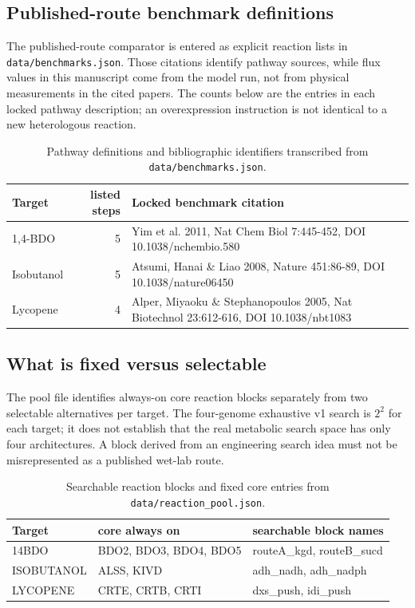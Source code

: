 \subsection{Published-route benchmark definitions}
The published-route comparator is entered as explicit reaction lists in \texttt{data/benchmarks.json}. Those citations identify pathway sources, while flux values in this manuscript come from the model run, not from physical measurements in the cited papers. The counts below are the entries in each locked pathway description; an overexpression instruction is not identical to a new heterologous reaction.\begin{table}[!htbp]\centering\small\caption{Pathway definitions and bibliographic identifiers transcribed from \texttt{data/benchmarks.json}.}\begin{tabular}{p{2cm}rp{6.6cm}}\hline Target & listed steps & Locked benchmark citation \\\hline
1,4-BDO & 5 & Yim et al. 2011, Nat Chem Biol 7:445-452, DOI 10.1038/nchembio.580 \\
Isobutanol & 5 & Atsumi, Hanai \& Liao 2008, Nature 451:86-89, DOI 10.1038/nature06450 \\
Lycopene & 4 & Alper, Miyaoku \& Stephanopoulos 2005, Nat Biotechnol 23:612-616, DOI 10.1038/nbt1083 \\
\hline\end{tabular}\end{table}
\subsection{What is fixed versus selectable}
The pool file identifies always-on core reaction blocks separately from two selectable alternatives per target. The four-genome exhaustive v1 search is $2^2$ for each target; it does not establish that the real metabolic search space has only four architectures. A block derived from an engineering search idea must not be misrepresented as a published wet-lab route.
\begin{table}[!htbp]\centering\small\caption{Searchable reaction blocks and fixed core entries from \texttt{data/reaction\_pool.json}.}\begin{tabular}{lp{4.1cm}p{5cm}}\hline Target & core always on & searchable block names \\\hline
14BDO & BDO2, BDO3, BDO4, BDO5 & routeA\_kgd, routeB\_sucd \\
ISOBUTANOL & ALSS, KIVD & adh\_nadh, adh\_nadph \\
LYCOPENE & CRTE, CRTB, CRTI & dxs\_push, idi\_push \\
\hline\end{tabular}\end{table}
